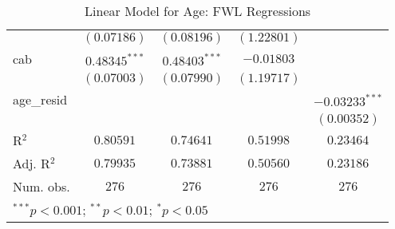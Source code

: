 \begin{table}
\begin{center}
\begin{tabular}{l c c c c}
                    & $(0.07186)$      & $(0.08196)$      & $(1.22801)$      &                  \\
cab                 & $0.48345^{***}$  & $0.48403^{***}$  & $-0.01803$       &                  \\
                    & $(0.07003)$      & $(0.07990)$      & $(1.19717)$      &                  \\
age\_resid          &                  &                  &                  & $-0.03233^{***}$ \\
                    &                  &                  &                  & $(0.00352)$      \\
\hline
R$^2$               & $0.80591$        & $0.74641$        & $0.51998$        & $0.23464$        \\
Adj. R$^2$          & $0.79935$        & $0.73881$        & $0.50560$        & $0.23186$        \\
Num. obs.           & $276$            & $276$            & $276$            & $276$            \\
\hline
\multicolumn{5}{l}{\scriptsize{$^{***}p<0.001$; $^{**}p<0.01$; $^{*}p<0.05$}}
\end{tabular}
\caption{Linear Model for Age: FWL Regressions}
\label{tab:reg_age_fwl}
\end{center}
\end{table}

